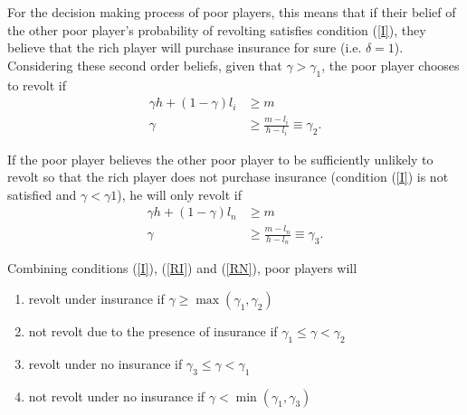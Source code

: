 \documentclass[12pt]{article}
\begin{document}
	For the decision making process of poor players, this means that if their 
	belief of the other poor player's probability of revolting satisfies 
	condition (\ref{I}), they believe that the rich player will purchase 
	insurance for sure (i.e. $\delta=1$). Considering these second order 
	beliefs, given that $\gamma>\gamma_1$, the poor player chooses to revolt if
	\begin{align*}
		\gamma h + (1-\gamma)l_i &\geq m\\
		\gamma &\geq \frac{m-l_i}{h-l_i} \equiv \gamma_2. \tag{RI}\label{RI}
	\end{align*}
	
	If the poor player believes the other poor player to be sufficiently 
	unlikely to revolt so that the rich player does not purchase insurance 
	(condition (\ref{I}) is not satisfied and $\gamma<\gamma1$), he will only 
	revolt if
	\begin{align*}
		\gamma h + (1-\gamma)l_n &\geq m\\
		\gamma &\geq \frac{m-l_n}{h-l_n} \equiv \gamma_3. \tag{RN}\label{RN}
	\end{align*}
	
	Combining conditions (\ref{I}), (\ref{RI}) and (\ref{RN}), poor players will
	\begin{enumerate}
		\item revolt under insurance if $\gamma \geq \max (\gamma_1, \gamma_2)$
		\item not revolt due to the presence of insurance if $\gamma_1 \leq 
		\gamma < \gamma_2$
		\item revolt under no insurance if $\gamma_3 \leq \gamma < \gamma_1$
		\item not revolt under no insurance if $\gamma < \min (\gamma_1, 
		\gamma_3)$
	\end{enumerate}
	
\end{document}
